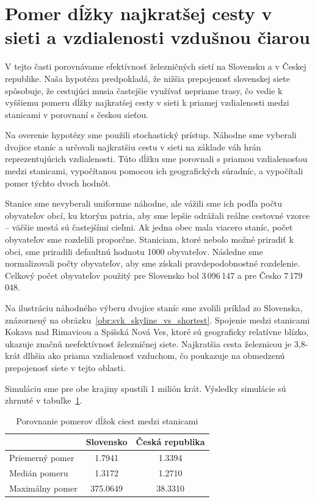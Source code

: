 \documentclass[main.tex]{subfiles}
\begin{document}
	
\section{Pomer dĺžky najkratšej cesty v sieti a vzdialenosti vzdušnou čiarou}
\label{sec:random_paths}

V tejto časti porovnávame efektívnosť železničných sietí na Slovensku a v Českej republike. Naša hypotéza predpokladá, že nižšia prepojenosť slovenskej siete spôsobuje, že cestujúci musia častejšie využívať nepriame trasy, čo vedie k vyššiemu pomeru dĺžky najkratšej cesty v sieti k priamej vzdialenosti medzi stanicami v porovnaní s českou sieťou.

Na overenie hypotézy sme použili stochastický prístup. Náhodne sme vyberali dvojice staníc a určovali najkratšiu cestu v sieti na základe váh hrán reprezentujúcich vzdialenosti. Túto dĺžku sme porovnali s priamou vzdialenosťou medzi stanicami, vypočítanou pomocou ich geografických súradníc, a vypočítali pomer týchto dvoch hodnôt.

Stanice sme nevyberali uniformne náhodne, ale vážili sme ich podľa počtu obyvateľov obcí, ku ktorým patria, aby sme lepšie odrážali reálne cestovné vzorce – väčšie mestá sú častejšími cieľmi. Ak jedna obec mala viacero staníc, počet obyvateľov sme rozdelili proporčne. Staniciam, ktoré nebolo možné priradiť k obci, sme priradili defaultnú hodnotu 1000 obyvateľov. Následne sme normalizovali počty obyvateľov, aby sme získali pravdepodobnostné rozdelenie. Celkový počet obyvateľov použitý pre Slovensko bol 3\,096\,147 a pre Česko 7\,179\,048.

Na ilustráciu náhodného výberu dvojice staníc sme zvolili príklad zo Slovenska, znázornený na obrázku~\ref{obr:svk_skyline_vs_shortest}. Spojenie medzi stanicami Kokava nad Rimavicou a Spišská Nová Ves, ktoré sú geograficky relatívne blízko, ukazuje značnú neefektívnosť železničnej siete. Najkratšia cesta železnicou je 3,8-krát dlhšia ako priama vzdialenosť vzduchom, čo poukazuje na obmedzenú prepojenosť siete v tejto oblasti.

Simuláciu sme pre obe krajiny spustili 1 milión krát. Výsledky simulácie sú zhrnuté v tabuľke~\ref{tab:ratios}.

\begin{table}[H]
\centering
\begin{tabular}{|l|c|c|}
\hline
 & Slovensko & Česká republika \\
\hline
Priemerný pomer & 1.7941 & 1.3394 \\
Medián pomeru & 1.3172 & 1.2710 \\
Maximálny pomer & 375.0649 & 38.3310 \\
\hline
\end{tabular}
\caption{Porovnanie pomerov dĺžok ciest medzi stanicami}
\label{tab:ratios}
\end{table}
\end{document}
